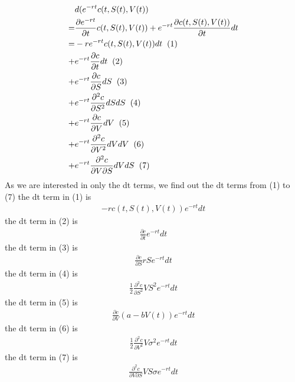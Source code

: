 \documentclass[a4paper]{article}
\begin{document}
\begin{align*}
	& d(e^{-rt}c(t, S(t), V(t))\\
	= & \frac{\partial e^{-rt}}{\partial t} c(t, S(t), V(t)) 
	+ e^{-rt}\frac{\partial c(t, S(t), V(t))}{\partial t} dt \\
	= & -re^{-rt}c(t, S(t),V(t))dt \hspace{2mm} (1)\\
	+ & e^{-rt} \frac{\partial c}{\partial t} dt \hspace{2mm} (2) \\
	+ & e^{-rt} \frac{\partial c}{\partial S} dS \hspace{2mm} (3) \\
	+ & e^{-rt} \frac{\partial^2 c}{\partial S^2} dS dS \hspace{2mm} (4)\\
	+ & e^{-rt} \frac{\partial c}{\partial V} dV \hspace{2mm} (5) \\
	+ & e^{-rt} \frac{\partial^2 c}{\partial V^2} dV dV\hspace{2mm} (6)\\
	+ & e^{-rt} \frac{\partial^2 c}{\partial V \partial S} dV dS\hspace{2mm} (7)
\end{align*}
As we are interested in only the dt terms, we find out the dt terms from (1) to (7)
the dt term in (1) is
\begin{align*}
	-rc(t, S(t), V(t))e^{-rt}dt
\end{align*}
the dt term in (2) is
\begin{align*}
	\frac{\partial c}{\partial t}e^{-rt}dt
\end{align*}
the dt term in (3) is
\begin{align*}
	\frac{\partial c}{\partial S}rSe^{-rt}dt
\end{align*}
the dt term in (4) is
\begin{align*}
	\frac{1}{2} \frac{\partial^2 c}{\partial S^2}VS^2e^{-rt}dt
\end{align*}
the dt term in (5) is
\begin{align*}
	\frac{\partial c}{\partial V}(a-bV(t))e^{-rt}dt
\end{align*}
the dt term in (6) is
\begin{align*}
	\frac{1}{2} \frac{\partial^2 c}{\partial V^2}V\sigma^2e^{-rt}dt
\end{align*}
the dt term in (7) is
\begin{align*}
	\frac{\partial^2 c}{\partial V \partial S} VS\sigma e^{-rt}dt
\end{align*}
\end{document}

